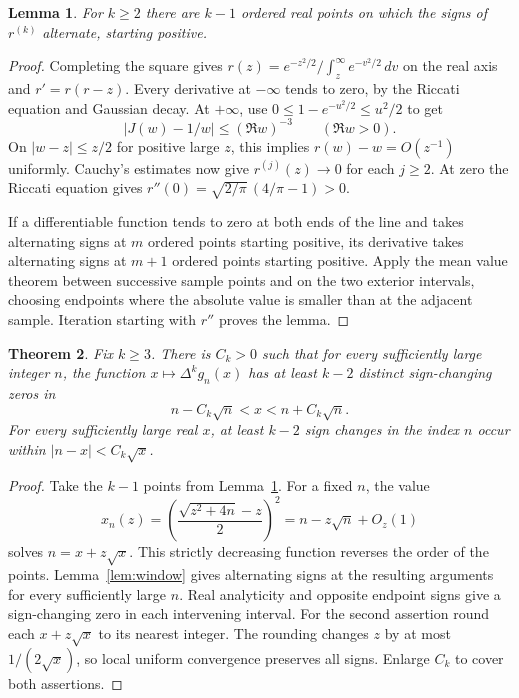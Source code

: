 \documentclass[11pt,a4paper]{article}
\newtheorem{theorem}{Theorem}[section]
\newtheorem{lemma}[theorem]{Lemma}
\begin{document}
\begin{lemma}\label{lem:rolle}
For $k\ge2$ there are $k-1$ ordered real points on which the signs of $r^{(k)}$ alternate, starting positive.
\end{lemma}
\begin{proof}
Completing the square gives $r(z)=e^{-z^2/2}/\int_z^\infty e^{-v^2/2}\,dv$ on the real axis and $r'=r(r-z)$. Every derivative at $-\infty$ tends to zero, by the Riccati equation and Gaussian decay. At $+\infty$, use $0\le1-e^{-u^2/2}\le u^2/2$ to get
\[
 |J(w)-1/w|\le (\Re w)^{-3}\qquad(\Re w>0).
\]
On $|w-z|\le z/2$ for positive large $z$, this implies $r(w)-w=O(z^{-1})$ uniformly. Cauchy's estimates now give $r^{(j)}(z)\to0$ for each $j\ge2$. At zero the Riccati equation gives $r''(0)=\sqrt{2/\pi}\,(4/\pi-1)>0$.

If a differentiable function tends to zero at both ends of the line and takes alternating signs at $m$ ordered points starting positive, its derivative takes alternating signs at $m+1$ ordered points starting positive. Apply the mean value theorem between successive sample points and on the two exterior intervals, choosing endpoints where the absolute value is smaller than at the adjacent sample. Iteration starting with $r''$ proves the lemma.
\end{proof}

\begin{theorem}\label{thm:roots}
Fix $k\ge3$. There is $C_k>0$ such that for every sufficiently large integer $n$, the function $x\mapsto\Delta^k g_n(x)$ has at least $k-2$ distinct sign-changing zeros in
\[
 n-C_k\sqrt n < x < n+C_k\sqrt n.
\]
For every sufficiently large real $x$, at least $k-2$ sign changes in the index $n$ occur within $|n-x|<C_k\sqrt{x}$.
\end{theorem}
\begin{proof}
Take the $k-1$ points from Lemma~\ref{lem:rolle}. For a fixed $n$, the value
\[
 x_n(z)=\left(\frac{\sqrt{z^2+4n}-z}{2}\right)^2
        =n-z\sqrt n+O_z(1)
\]
solves $n=x+z\sqrt{x}$. This strictly decreasing function reverses the order of the points. Lemma~\ref{lem:window} gives alternating signs at the resulting arguments for every sufficiently large $n$. Real analyticity and opposite endpoint signs give a sign-changing zero in each intervening interval. For the second assertion round each $x+z\sqrt{x}$ to its nearest integer. The rounding changes $z$ by at most $1/(2\sqrt{x})$, so local uniform convergence preserves all signs. Enlarge $C_k$ to cover both assertions.
\end{proof}
\end{document}
